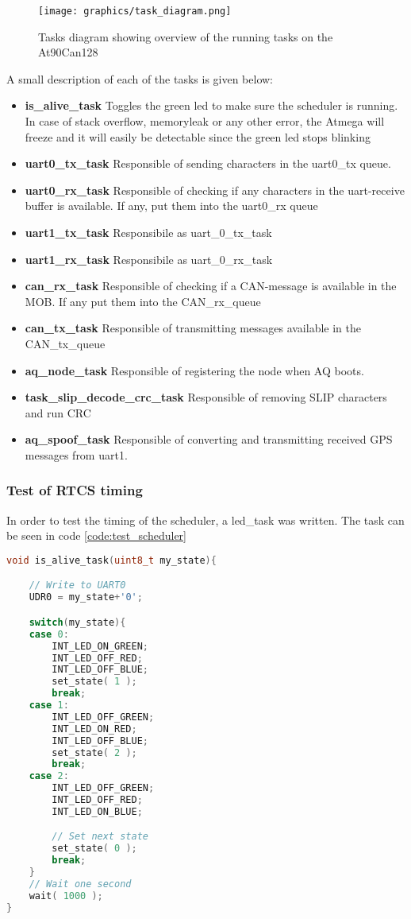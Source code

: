\begin{figure}[H]
    \center
    \texttt{[image: graphics/task\_diagram.png]}
  \caption{Tasks diagram showing overview of the running tasks on the At90Can128}
    \label{fig:task_diagram_atmega}
\end{figure}
A small description of each of the tasks is given below:
\begin{itemize}
\item \textbf{ is\_alive\_task} Toggles the green led to make sure the scheduler is running. In case of stack overflow, memoryleak or any other error, the Atmega will freeze and it will easily be detectable since the green led stops blinking
\item \textbf{ uart0\_tx\_task} Responsible of sending characters in the uart0\_tx queue.
\item \textbf{ uart0\_rx\_task} Responsible of checking if any characters in the uart-receive buffer is available. If any, put them into the uart0\_rx queue
\item \textbf{ uart1\_tx\_task} Responsibile as uart\_0\_tx\_task
\item \textbf{ uart1\_rx\_task} Responsibile as uart\_0\_rx\_task
\item \textbf{ can\_rx\_task} Responsible of checking if a CAN-message is available in the MOB. If any put them into the CAN\_rx\_queue
\item \textbf{ can\_tx\_task} Responsible of transmitting messages available in the CAN\_tx\_queue
\item \textbf{ aq\_node\_task} Responsible of registering the node when AQ boots.
\item \textbf{ task\_slip\_decode\_crc\_task} Responsible of removing SLIP characters and run CRC
\item \textbf{ aq\_spoof\_task} Responsible of converting and transmitting received GPS messages from uart1.
\end{itemize}

\subsubsection*{Test of RTCS timing}
In order to test the timing of the scheduler, a led\_task was written. The task can be seen in code \ref{code:test_scheduler}
\begin{lstlisting}[language = c, caption = RTCS task used in timing test, label=code:test_scheduler]
void is_alive_task(uint8_t my_state){

	// Write to UART0
	UDR0 = my_state+'0';

	switch(my_state){
	case 0:
		INT_LED_ON_GREEN;
		INT_LED_OFF_RED;
		INT_LED_OFF_BLUE;
	    set_state( 1 );
		break;
	case 1:
		INT_LED_OFF_GREEN;
		INT_LED_ON_RED;
		INT_LED_OFF_BLUE;
	    set_state( 2 );
		break;
	case 2:
		INT_LED_OFF_GREEN;
		INT_LED_OFF_RED;
		INT_LED_ON_BLUE;

		// Set next state
	    set_state( 0 );
		break;
	}
	// Wait one second
	wait( 1000 );
}
\end{lstlisting}

